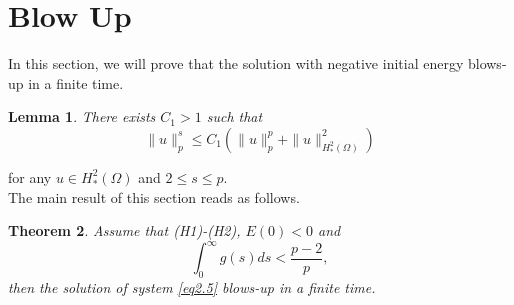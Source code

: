 \documentclass[12pt]{article}
\numberwithin{equation}{section}
\newtheorem{theorem}{Theorem}[section]
\newtheorem{lemma}[theorem]{Lemma}
\begin{document}
\section{Blow Up}\label{sec_blowup}
In this section, we will prove that the solution with negative initial energy blows-up in a finite time.
\begin{lemma}\label{le5.1}
There exists $C_1>1$ such that
\begin{equation}
\|u\|_{p}^{s} \leq C_1\left(\|u\|_{p}^{p}+\|u\|^2_{H^2_*(\Omega)}\right)
\end{equation}
\end{lemma}
for any $u \in H_{*}^{2}(\Omega)$ and $2 \leq s \leq p$.\\
The main result of this section reads as follows.
\begin{theorem}\label{teo6.2}
Assume that (H1)-(H2), $E(0)< 0$ and
\begin{equation}\label{eq5.3}
\displaystyle\int_{0}^{\infty} g(s) d s<\frac{p-2}{p},
\end{equation}
then the solution of system \eqref{eq2.5} blows-up in a finite time.
\end{theorem}
\end{document}
